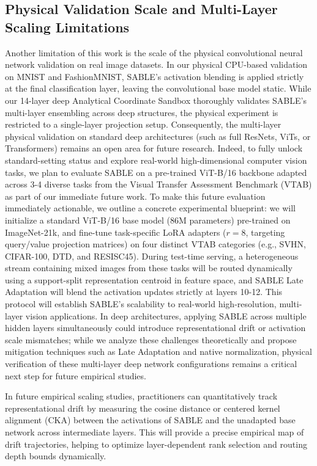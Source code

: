 \subsection{Physical Validation Scale and Multi-Layer Scaling Limitations}
Another limitation of this work is the scale of the physical convolutional neural network validation on real image datasets. In our physical CPU-based validation on MNIST and FashionMNIST, SABLE's activation blending is applied strictly at the final classification layer, leaving the convolutional base model static. While our 14-layer deep Analytical Coordinate Sandbox thoroughly validates SABLE's multi-layer ensembling across deep structures, the physical experiment is restricted to a single-layer projection setup. Consequently, the multi-layer physical validation on standard deep architectures (such as full ResNets, ViTs, or Transformers) remains an open area for future research. Indeed, to fully unlock standard-setting status and explore real-world high-dimensional computer vision tasks, we plan to evaluate SABLE on a pre-trained ViT-B/16 backbone adapted across 3-4 diverse tasks from the Visual Transfer Assessment Benchmark (VTAB) as part of our immediate future work. To make this future evaluation immediately actionable, we outline a concrete experimental blueprint: we will initialize a standard ViT-B/16 base model (86M parameters) pre-trained on ImageNet-21k, and fine-tune task-specific LoRA adapters ($r=8$, targeting query/value projection matrices) on four distinct VTAB categories (e.g., SVHN, CIFAR-100, DTD, and RESISC45). During test-time serving, a heterogeneous stream containing mixed images from these tasks will be routed dynamically using a support-split representation centroid in feature space, and SABLE Late Adaptation will blend the activation updates strictly at layers 10-12. This protocol will establish SABLE's scalability to real-world high-resolution, multi-layer vision applications. In deep architectures, applying SABLE across multiple hidden layers simultaneously could introduce representational drift or activation scale mismatches; while we analyze these challenges theoretically and propose mitigation techniques such as Late Adaptation and native normalization, physical verification of these multi-layer deep network configurations remains a critical next step for future empirical studies.

In future empirical scaling studies, practitioners can quantitatively track representational drift by measuring the cosine distance or centered kernel alignment (CKA) between the activations of SABLE and the unadapted base network across intermediate layers. This will provide a precise empirical map of drift trajectories, helping to optimize layer-dependent rank selection and routing depth bounds dynamically.

